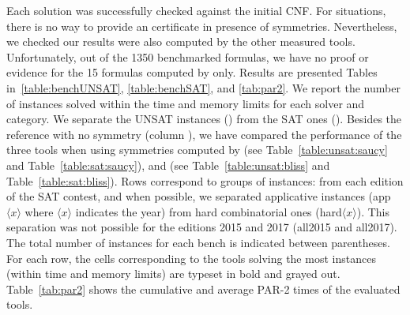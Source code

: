 Each \sat solution was successfully checked against the initial CNF. For \unsat
situations, there is no way to provide an \unsat certificate in presence of
symmetries. Nevertheless, we checked our results were also computed by the
other measured tools. Unfortunately, out of the 1350 benchmarked formulas, we
have no proof or evidence for the 15 \unsat formulas computed by \cdclsym{}
only.
Results are presented Tables in~\ref{table:benchUNSAT}, \ref{table:benchSAT},
and \ref{tab:par2}. We report the number of instances solved within the time
and memory limits for each solver and category. We separate the UNSAT instances
() from the SAT ones (). Besides
the reference with no symmetry (column \minisat{}), we have compared the
performance of the three tools when using symmetries computed by \saucy{} (see
Table~\ref{table:unsat:saucy} and Table~\ref{table:sat:saucy}), and \bliss{}
(see Table~\ref{table:unsat:bliss} and Table~\ref{table:sat:bliss}). Rows
correspond to groups of instances: from each edition of the SAT contest, and
when possible, we separated applicative instances (app$\langle x \rangle$ where
$\langle x \rangle$ indicates the year) from hard combinatorial ones
(hard$\langle x \rangle$). This separation was not possible for the editions
2015 and 2017 (all2015 and all2017). The total number of instances for each
bench is indicated between parentheses. For each row, the cells corresponding
to the tools solving the most instances (within time and memory limits) are
typeset in bold and grayed out. Table~\ref{tab:par2} shows the cumulative and
average PAR-2 times of the evaluated tools.
